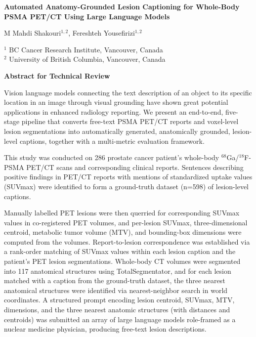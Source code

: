 \documentclass[11pt]{article}
\begin{document}
\begin{center}
{\Large \bfseries Automated Anatomy-Grounded Lesion Captioning for Whole-Body \\ PSMA PET/CT Using Large Language Models}

\vspace{8pt}
{\large M Mahdi Shakouri$^{1,2}$, Fereshteh Yousefirizi$^{1,2}$}

\vspace{4pt}
{\normalsize $^{1}$ BC Cancer Research Institute, Vancouver, Canada \\
$^{2}$ University of British Columbia, Vancouver, Canada \\
}

\end{center}

\vspace{10pt}
{\bfseries \large Abstract for Technical Review}

Vision language models connecting the text description of an object to its specific location in an
image through visual grounding have shown great potential applications in enhanced radiology reporting.
We present an end-to-end, five-stage pipeline that converts free-text PSMA PET/CT reports and voxel-level lesion segmentations into automatically generated, anatomically grounded, lesion-level captions, together with a multi-metric evaluation framework.

This study was conducted on 286 prostate cancer patient's whole-body $^{68}$Ga/$^{18}$F-PSMA PET/CT scans and corresponding clinical reports. Sentences describing positive findings in PET/CT reports with mentions of standardized uptake values (SUVmax) were identified to form a ground-truth dataset (n=598) of lesion-level captions. 

Manually labelled PET lesions were then querried for corresponding SUVmax values in co-registered PET volumes, and per-lesion SUVmax, three-dimensional centroid, metabolic tumor volume (MTV), and bounding-box dimensions were computed from the volumes. Report-to-lesion correspondence was established via a rank-order matching of SUVmax values within each lesion caption and the patient's PET lesion segmentations. Whole-body CT volumes were segmented into 117 anatomical structures using TotalSegmentator, and for each lesion matched with a caption from the ground-truth dataset, the three nearest anatomical structures were identified via nearest-neighbor search in world coordinates. A structured prompt encoding lesion centroid, SUVmax, MTV, dimensions, and the three nearest anatomic structures (with distances and centroids) was submitted an array of large language models role-framed as a nuclear medicine physician, producing free-text lesion descriptions. 
\end{document}
